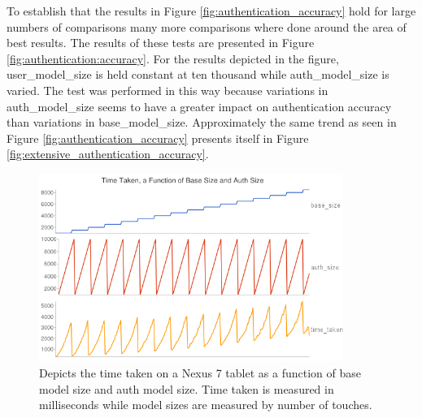 \documentclass{acm_proc_article-sp}
\begin{document}
%
To establish that the results in Figure \ref{fig:authentication_accuracy} hold for large numbers of comparisons many more comparisons where done around the area of best results. The results of these tests are presented in Figure \ref{fig:authentication:accuracy}. For the results depicted in the figure, user\_model\_size is held constant at ten thousand while auth\_model\_size is varied. The test was performed in this way because variations in auth\_model\_size seems to have a greater impact on authentication accuracy than variations in base\_model\_size. Approximately the same trend as seen in Figure \ref{fig:authentication_accuracy} presents itself in Figure \ref{fig:extensive_authentication_accuracy}.

\begin{figure}
\centering
\includegraphics[width=3.9in]{nexus_speed_test.png}
\caption{Depicts the time taken on a Nexus 7 tablet as a function of base model size and auth model size. Time taken is measured in milliseconds while model sizes are measured by number of touches.}
\label{fig:nexus_speed_test}
\end{figure}
\end{document}
